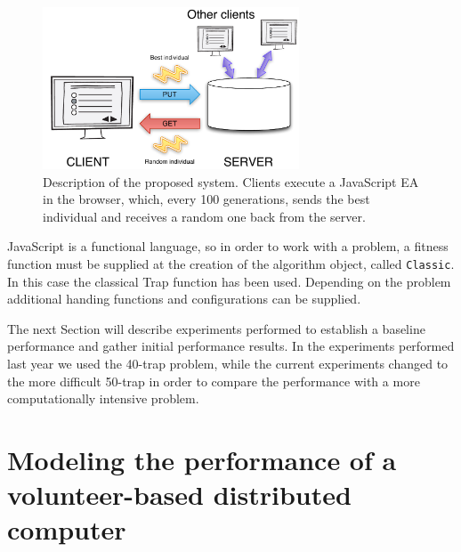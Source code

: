 \documentclass[letterpaper]{article}
\begin{document}
\begin{figure}[!t]
\centering
\includegraphics[width=3in]{system.pdf}
\caption{Description of the proposed system. Clients execute a JavaScript EA
  in the browser, which, every 100 generations, sends the best
  individual and receives a random one back from the server.}
\label{fig:system}
\end{figure}

JavaScript is a functional language, so in order to work with a
problem, a fitness function must be supplied at the creation of the algorithm object, 
called {\tt Classic}. In this case the classical Trap 
function \citep{Ackley1987} has been used. Depending on the
problem additional handing functions and configurations 
can be supplied. 

The next Section will describe experiments performed to
establish a baseline performance and gather initial performance
results. In the experiments performed last year we used the 40-trap
problem, while the current experiments changed to the more difficult 50-trap
in order to compare the performance with a more computationally intensive problem.

\section{Modeling the performance of a volunteer-based distributed computer} 
\label{sec:experiments}
\end{document}
